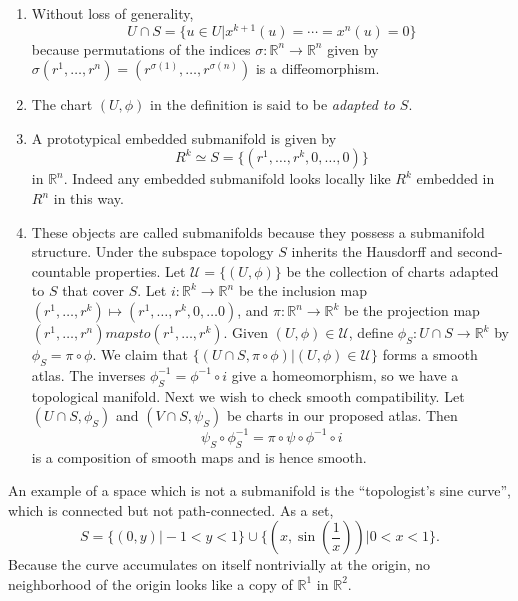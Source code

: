 \begin{remark}
  \begin{enumerate}
    \item{
      Without loss of generality,
      $$
      U \cap S = \{ u \in U \vert x^{k+1}(u) = \cdots = x^n(u) = 0 \}
      $$
      because permutations of the indices
      $\sigma: \mathbb{R}^n \to \mathbb{R}^n$ given by
      $\sigma(r^1, \dots, r^n) = (r^{\sigma(1)}, \dots,
      r^{\sigma(n)})$ is a diffeomorphism.
    }
    \item{
      The chart $(U, \phi)$ in the definition is said to be
      \emph{adapted to $S$}.
    }
    \item{
      A prototypical embedded submanifold is given by
      $$
      R^k \simeq S = \{ (r^1, \dots, r^k, 0, \dots, 0) \}
      $$
      in $\mathbb{R}^n$. Indeed any embedded submanifold looks locally
      like $R^k$ embedded in $R^n$ in this way.
    }
    \item{
      These objects are called submanifolds because they possess a
      submanifold structure.
      Under the subspace topology $S$ inherits the Hausdorff and
      second-countable properties.
      Let $\mathcal{U} = \{ (U, \phi) \}$ be the collection of charts
      adapted to $S$ that cover $S$. Let $i: \mathbb{R}^k \to
      \mathbb{R}^n$ be the inclusion map
      $(r^1, \dots, r^k) \mapsto (r^1, \dots, r^k, 0, \dots 0)$, and
      $\pi: \mathbb{R}^n \to \mathbb{R}^k$ be the projection map
      $(r^1, \dots, r^n) mapsto (r^1, \dots, r^k)$. Given
      $(U, \phi) \in \mathcal{U}$, define
      $\phi_S : U \cap S \to \mathbb{R}^k$ by $\phi_S = \pi \circ
      \phi$. We claim that
      $\{ (U \cap S, \pi \circ \phi) \vert (U, \phi) \in \mathcal{U}
      \}$ forms a smooth atlas. The inverses
      $\phi_S^{-1} = \phi^{-1} \circ i$ give a homeomorphism, so we
      have a topological manifold. Next we wish to check smooth
      compatibility. Let $(U \cap S, \phi_S)$ and $(V \cap S, \psi_S)$
      be charts in our proposed atlas. Then
      $$
      \psi_S \circ \phi_S^{-1} = \pi \circ \psi \circ \phi^{-1} \circ i
      $$
      is a composition of smooth maps and is hence smooth.
    }
  \end{enumerate}
\end{remark}

\begin{xmpl}
An example of a space which is not a submanifold is the ``topologist's
sine curve'', which is connected but not path-connected. As a set,
$$
S = \{ (0, y) \vert -1 < y < 1 \}
\cup \{ (x, \sin\left(\frac{1}{x}\right)) \vert 0 < x < 1 \}.
$$
Because the curve accumulates on itself nontrivially at the origin, no
neighborhood of the origin looks like a copy of $\mathbb{R}^1$ in $\mathbb{R}^2$.
\end{xmpl}

